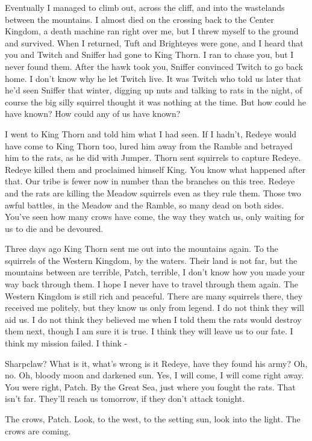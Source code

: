 \documentclass[12pt]{book}
\begin{document}
Eventually I managed to climb out, across the cliff, and into the wastelands between the mountains. I almost died on the crossing back to the Center Kingdom, a death machine ran right over me, but I threw myself to the ground and survived. When I returned, Tuft and Brighteyes were gone, and I heard that you and Twitch and Sniffer had gone to King Thorn. I ran to chase you, but I never found them. After the hawk took you, Sniffer convinced Twitch to go back home. I don't know why he let Twitch live. It was Twitch who told us later that he'd seen Sniffer that winter, digging up nuts and talking to rats in the night, of course the big silly squirrel thought it was nothing at the time. But how could he have known? How could any of us have known?

I went to King Thorn and told him what I had seen. If I hadn't, Redeye would have come to King Thorn too, lured him away from the Ramble and betrayed him to the rats, as he did with Jumper. Thorn sent squirrels to capture Redeye. Redeye killed them and proclaimed himself King. You know what happened after that. Our tribe is fewer now in number than the branches on this tree. Redeye and the rats are killing the Meadow squirrels even as they rule them. Those two awful battles, in the Meadow and the Ramble, so many dead on both sides. You've seen how many crows have come, the way they watch us, only waiting for us to die and be devoured.

Three days ago King Thorn sent me out into the mountains again. To the squirrels of the Western Kingdom, by the waters. Their land is not far, but the mountains between are terrible, Patch, terrible, I don't know how you made your way back through them. I hope I never have to travel through them again. The Western Kingdom is still rich and peaceful. There are many squirrels there, they received me politely, but they know us only from legend. I do not think they will aid us. I do not think they believed me when I told them the rats would destroy them next, though I am sure it is true. I think they will leave us to our fate. I think my mission failed. I think -

Sharpclaw? What is it, what's wrong %
is it Redeye, have they found his army? Oh, no. Oh, bloody moon and darkened sun. Yes, I will come, I will come right away. You were right, Patch. By the Great Sea, just where you fought the rats. That isn't far. They'll reach us tomorrow, if they don't attack tonight.

The crows, Patch. Look, to the west, to the setting sun, look into the light. The crows are coming.
\end{document}
